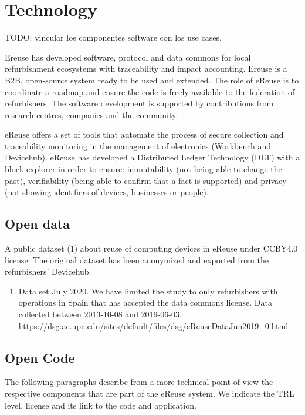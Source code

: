 \documentclass[
]{book}
\providecommand{\tightlist}{%
  \setlength{\itemsep}{0pt}\setlength{\parskip}{0pt}}
\begin{document}
\hypertarget{technology}{%
\chapter{Technology}\label{technology}}

TODO: vincular los componentes software con los use cases.

Ereuse has developed software, protocol and data commons for local refurbishment ecosystems with traceability and impact accounting. Ereuse is a B2B, open-source system ready to be used and extended. The role of eReuse is to coordinate a roadmap and ensure the code is freely available to the federation of refurbishers. The software development is supported by contributions from research centres, companies and the community.

eReuse offers a set of tools that automate the process of secure collection and traceability monitoring in the management of electronics (Workbench and Devicehub). eReuse has developed a Distributed Ledger Technology (DLT) with a block explorer in order to ensure: immutability (not being able to change the past), verifiability (being able to confirm that a fact is supported) and privacy (not showing identifiers of devices, businesses or people).

\hypertarget{open-data}{%
\section{Open data}\label{open-data}}

A public dataset (1) about reuse of computing devices in eReuse under CCBY4.0 license: The original dataset has been anonymized and exported from the refurbishers' Devicehub.

\begin{enumerate}
\def\labelenumi{\arabic{enumi}.}
\tightlist
\item
  Data set July 2020. We have limited the study to only refurbishers with operations in Spain that has accepted the data commons license. Data collected between 2013-10-08 and 2019-06-03.
  \url{https://dsg.ac.upc.edu/sites/default/files/dsg/eReuseDataJun2019_0.html}
\end{enumerate}

\hypertarget{open-code}{%
\section{Open Code}\label{open-code}}

The following paragraphs describe from a more technical point of view the respective components that are part of the eReuse system. We indicate the TRL level, license and its link to the code and application.
\end{document}
